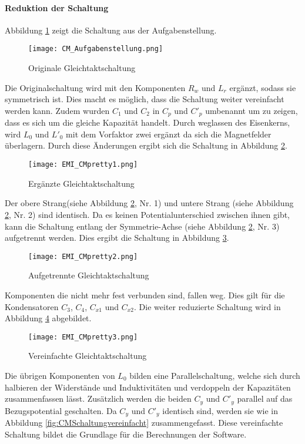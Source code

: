 \paragraph{Reduktion der Schaltung}\label{para:redukGleichtakt}
Abbildung \ref{fig:CMSchaltungOriginal} zeigt die Schaltung aus der Aufgabenstellung. 
\begin{figure}[H]
	\centering
	\texttt{[image: CM\_Aufgabenstellung.png]}
	\caption{Originale Gleichtaktschaltung\cite{aufgabenstellung}}
	\label{fig:CMSchaltungOriginal}
\end{figure}
Die Originalschaltung wird mit den Komponenten $R_w$ und $L_r$ ergänzt, sodass sie symmetrisch ist. Dies macht es möglich, dass die Schaltung weiter vereinfacht werden kann. Zudem wurden $C_1$ und $C_2$ in $C_p$ und $C'_p$ umbenannt um zu zeigen, dass es sich um die gleiche Kapazität handelt. Durch weglassen des Eisenkerns, wird $L_0$ und $L'_0$ mit dem Vorfaktor zwei ergänzt da sich die Magnetfelder überlagern.
Durch diese Änderungen ergibt sich die Schaltung in Abbildung \ref{fig:CMSchaltungErgänzt}.
\begin{figure}[H]
	\centering
	\texttt{[image: EMI\_CMpretty1.png]}
	\caption{Ergänzte Gleichtaktschaltung}
	\label{fig:CMSchaltungErgänzt}
\end{figure}
 Der obere Strang(siehe Abbildung \ref{fig:CMSchaltungErgänzt}, Nr. 1) und untere Strang (siehe Abbildung \ref{fig:CMSchaltungErgänzt}, Nr. 2) sind identisch. Da es keinen Potentialunterschied zwischen ihnen gibt, kann die Schaltung entlang der Symmetrie-Achse (siehe Abbildung \ref{fig:CMSchaltungErgänzt}, Nr. 3) aufgetrennt werden. Dies ergibt die Schaltung in Abbildung \ref{fig:CMSchaltungaufgetrennt}.

\begin{figure}[H]
	\centering
	\texttt{[image: EMI\_CMpretty2.png]}
	\caption{Aufgetrennte Gleichtaktschaltung}
	\label{fig:CMSchaltungaufgetrennt}
\end{figure}
Komponenten die nicht mehr fest verbunden sind, fallen weg. Dies gilt für die Kondensatoren $C_3$, $C_4$, $C_{x1}$ und $C_{x2}$. Die weiter reduzierte Schaltung wird in Abbildung \ref{fig:CMSchaltungvereinfacht1} abgebildet.
\begin{figure}[H]
	\centering
	\texttt{[image: EMI\_CMpretty3.png]}
	\caption{Vereinfachte Gleichtaktschaltung}
	\label{fig:CMSchaltungvereinfacht1}
\end{figure}
Die übrigen Komponenten von $L_0$ bilden eine Parallelschaltung, welche sich durch halbieren der Widerstände und Induktivitäten und verdoppeln der Kapazitäten zusammenfassen lässt. Zusätzlich werden die beiden $C_y$ und $C'_{y}$ parallel auf das Bezugspotential geschalten. Da $C_y$ und $C'_y$ identisch sind, werden sie wie in Abbildung \ref{fig:CMSchaltungvereinfacht} zusammengefasst. Diese vereinfachte Schaltung bildet die Grundlage für die Berechnungen der Software.


